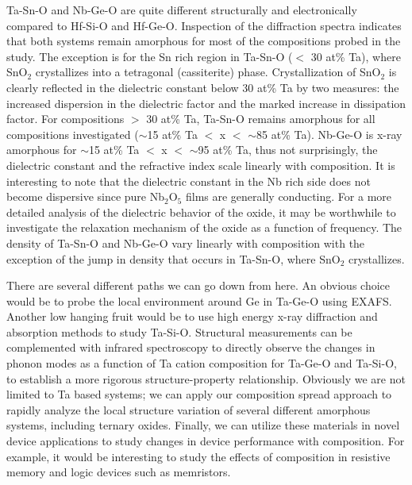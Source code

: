 Ta-Sn-O and Nb-Ge-O are quite different structurally and electronically compared to Hf-Si-O and Hf-Ge-O. Inspection of the diffraction spectra indicates that both systems remain amorphous for most of the compositions probed in the study. The exception is for the Sn rich region in Ta-Sn-O ($<$ 30 at\% Ta), where SnO$_{2}$ crystallizes into a tetragonal (cassiterite) phase. Crystallization of SnO$_{2}$ is clearly reflected in the dielectric constant below 30 at\% Ta by two measures: the increased dispersion in the dielectric factor and the marked increase in dissipation factor. For compositions $>$ 30 at\% Ta, Ta-Sn-O remains amorphous for all compositions investigated ($\sim$15 at\% Ta $<$ x $<$ $\sim$85 at\% Ta). Nb-Ge-O is x-ray amorphous for $\sim$15 at\% Ta $<$ x $<$ $\sim$95 at\% Ta, thus not surprisingly, the dielectric constant and the refractive index scale linearly with composition. It is interesting to note that the dielectric constant in the Nb rich side does not become dispersive since pure Nb$_{2}$O$_{5}$ films are generally conducting. For a more detailed analysis of the dielectric behavior of the oxide, it may be worthwhile to investigate the relaxation mechanism of the oxide as a function of frequency. The density of Ta-Sn-O and Nb-Ge-O vary linearly with composition with the exception of the jump in density that occurs in Ta-Sn-O, where SnO$_{2}$ crystallizes.                

There are several different paths we can go down from here. An obvious choice would be to probe the local environment around Ge in Ta-Ge-O using EXAFS. Another low hanging fruit would be to use high energy x-ray diffraction and absorption methods to study Ta-Si-O. Structural measurements can be complemented with infrared spectroscopy to directly observe the changes in phonon modes as a function of Ta cation composition for Ta-Ge-O and Ta-Si-O, to establish a more rigorous structure-property relationship. Obviously we are not limited to Ta based systems; we can apply our composition spread approach to rapidly analyze the local structure variation of several different amorphous systems, including ternary oxides. Finally, we can utilize these materials in novel device applications to study changes in device performance with composition. For example, it would be interesting to study the effects of composition in resistive memory and logic devices such as memristors.
